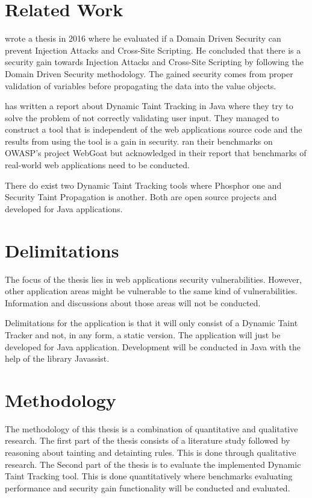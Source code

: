 \section{Related Work}
\label{RelatedWork}
\textcite{Stendahl2016} wrote a thesis in 2016 where he evaluated if a Domain Driven Security can prevent Injection Attacks and Cross-Site Scripting. He concluded that there is a security gain towards Injection Attacks and Cross-Site Scripting by following the Domain Driven Security methodology. The gained security comes from proper validation of variables before propagating the data into the value objects.

\textcite{Haldar} has written a report about Dynamic Taint Tracking in Java where they try to solve the problem of not correctly validating user input. They managed to construct a tool that is independent of the web applications source code and the results from using the tool is a gain in security. \textcite{Haldar} ran their benchmarks on OWASP’s project WebGoat \parencite{webgoat} but acknowledged in their report that benchmarks of real-world web applications need to be conducted.

There do exist two Dynamic Taint Tracking tools where Phosphor \parencite{phosphor} one and Security Taint Propagation \parencite{securityTaint} is another. Both are open source projects and developed for Java applications.


\section{Delimitations}
\label{Delimitations}
The focus of the thesis lies in web applications security vulnerabilities. However, other application areas might be vulnerable to the same kind of vulnerabilities. Information and discussions about those areas will not be conducted.

Delimitations for the application is that it will only consist of a Dynamic Taint Tracker and not, in any form, a static version. The application will just be developed for Java application. Development will be conducted in Java with the help of the library Javassist.


\section{Methodology}
\label{Methodology}
The methodology of this thesis is a combination of quantitative and qualitative research. The first part of the thesis consists of a literature study followed by reasoning about tainting and detainting rules. This is done through qualitative research. The Second part of the thesis is to evaluate the implemented Dynamic Taint Tracking tool. This is done quantitatively where benchmarks evaluating performance and security gain functionality will be conducted and evaluated.
